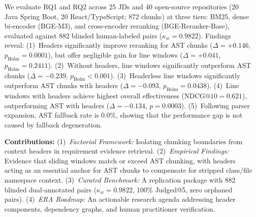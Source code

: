 We evaluate RQ1 and RQ2 across 25 JDs and 40 open-source repositories (20 Java Spring Boot, 20 React/TypeScript; 872 chunks) at three tiers: BM25, dense bi-encoder (BGE-M3), and cross-encoder reranking (BGE-Reranker-Base), evaluated against 882 blinded human-labeled pairs ($\kappa_w = 0.9822$). 
Findings reveal: 
(1)~Headers significantly improve reranking for AST chunks ($\Delta = +0.146$, $p_{\mathrm{Holm}} = 0.0001$), but offer negligible gain for line windows ($\Delta = +0.041$, $p_{\mathrm{Holm}} = 0.2411$). 
(2)~Without headers, line windows significantly outperform AST chunks ($\Delta = -0.239$, $p_{\mathrm{Holm}} < 0.001$). 
(3)~Headerless line windows significantly outperform AST chunks with headers ($\Delta = -0.093$, $p_{\mathrm{Holm}} = 0.0438$). 
(4)~Line windows with headers achieve highest overall effectiveness ($\text{NDCG@10} = 0.621$), outperforming AST with headers ($\Delta = -0.134$, $p = 0.0003$). 
(5)~Following parser expansion, AST fallback rate is $0.0\%$, showing that the performance gap is not caused by fallback degeneration.

\textbf{Contributions:} (1)~\textit{Factorial Framework:} Isolating chunking boundaries from context headers in requirement evidence retrieval. 
(2)~\textit{Empirical Findings:} Evidence that sliding windows match or exceed AST chunking, with headers acting as an essential anchor for AST chunks to compensate for stripped class/file namespace context. 
(3)~\textit{Curated Benchmark:} A replication package with 882 blinded dual-annotated pairs ($\kappa_w = 0.9822$, 100\% Judged@5, zero orphaned pairs). 
(4)~\textit{ERA Roadmap:} An actionable research agenda addressing header components, dependency graphs, and human practitioner verification.
